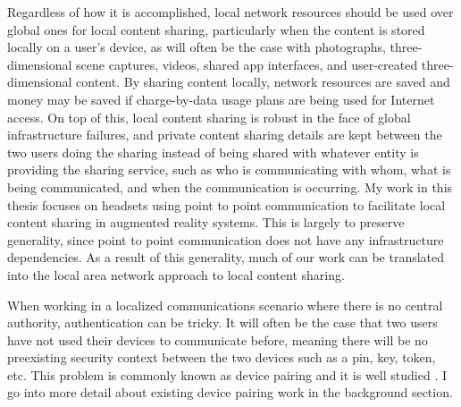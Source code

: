 \documentclass[12pt]{report}
\begin{document}
Regardless of how it is accomplished, local network resources should be used over global ones for local content sharing, particularly when the content is stored locally on a user's device, as will often be the case with photographs, three-dimensional scene captures, videos, shared app interfaces, and user-created three-dimensional content. By sharing content locally, network resources are saved and money may be saved if charge-by-data usage plans are being used for Internet access. On top of this, local content sharing is robust in the face of global infrastructure failures, and private content sharing details are kept between the two users doing the sharing instead of being shared with whatever entity is providing the sharing service, such as who is communicating with whom, what is being communicated, and when the communication is occurring. My work in this thesis focuses on headsets using point to point communication to facilitate local content sharing in augmented reality systems. This is largely to preserve generality, since point to point communication does not have any infrastructure dependencies. As a result of this generality, much of our work can be translated into the local area network approach to local content sharing. \par

When working in a localized communications scenario where there is no central authority, authentication can be tricky. It will often be the case that two users have not used their devices to communicate before, meaning there will be no preexisting security context between the two devices such as a pin, key, token, etc. This problem is commonly known as device pairing and it is well studied \cite{ConferenceCompStudySecurePairingKumar2009,VisualChannelPairingSaxena2006,InBandPairingGollaktoa2011,DucklingStajano2000,PlayfulPairingGallego2011,SASVaudenay2005,ManaGehrmann2004,ShakeWellBeforeUseMayrhofer2009,SeeingIsBelievingMcCune2005,TalkingToStrangersSmetters2002,LoudAndClearGoodrich2006,HapadepSoriente2008}. I go into more detail about existing device pairing work in the background section. \par 
\end{document}
